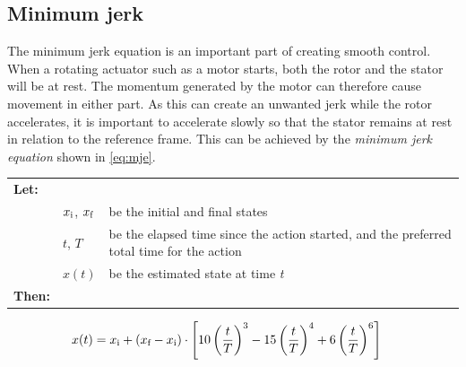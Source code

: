 \documentclass[11pt]{article}
\begin{document}
\subsection{Minimum jerk}
The minimum jerk equation is an important part of creating smooth control. When a rotating actuator such as a motor starts, both the rotor and the stator will be at rest. The momentum generated by the motor can therefore cause movement in either part. As this can create an unwanted jerk while the rotor accelerates, it is important to accelerate slowly so that the stator remains at rest in relation to the reference frame. This can be achieved by the \emph{minimum jerk equation} shown in \vref{eq:mje}.
\par \vspace{10pt}
{\footnotesize
  \begin{tabular}{l l l}
    \textbf{Let:} \\
 &$x_\textup{i}$, $x_\textup{f}$ &be the initial and final states\\
 &$t$, $T$ &be the elapsed time since the action started, and the preferred total time for the action  \\
 &$x(t)$ &be the estimated state at time \emph{t} \\
    \textbf{Then:}
  \end{tabular}
  \begin{align}
    x(t) &= x_\textup{i} +  (x_\textup{f} - x_\textup{i}) \cdot \left[10\left(\frac{t}{T}\right)^3 - 15\left(\frac{t}{T}\right)^4 + 6\left(\frac{t}{T}\right)^6 \right]\label{eq:mje}          
  \end{align}}
\end{document}
